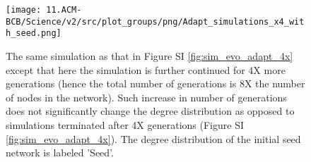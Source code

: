 \begin{figure}[H]%
        \centering
                \texttt{[image: 11.ACM-BCB/Science/v2/src/plot\_groups/png/Adapt\_simulations\_x4\_with\_seed.png]}
                \caption
                    {
                        The same simulation as that in Figure SI \ref{fig:sim_evo_adapt_4x} except that here the simulation is further continued for 4X more generations (hence the total number of generations is 8X the number of nodes in the network). Such increase in number of generations does not significantly change the degree distribution as opposed to simulations terminated after 4X generations (Figure SI \ref{fig:sim_evo_adapt_4x}). The degree distribution of the initial seed network is labeled 'Seed'.
                    }
                \label{fig:sim_evo_adapt_8x}
\end{figure}

\clearpage %


\newpage




